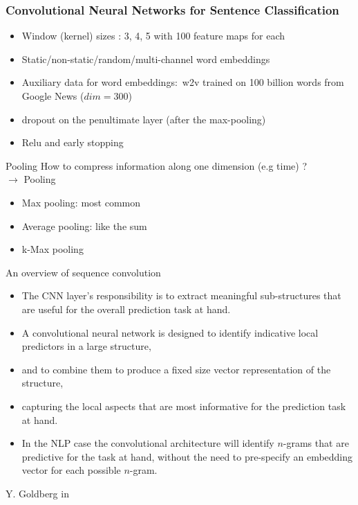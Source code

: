 \begin{frame}
  \frametitle{Convolutional Neural Networks for Sentence
    Classification}
  \begin{itemize}
  \item Window (kernel) sizes : 3, 4, 5 with 100 feature maps for each
  \item Static/non-static/random/multi-channel word embeddings
  \item Auxiliary data for word embeddings:~w2v trained on 100 billion words from
    Google News ($dim=300$) 
  \item dropout on the penultimate layer (after
    the max-pooling)
  \item Relu and early stopping
  \end{itemize}
\end{frame}


\begin{frame}{Pooling}
  How to compress information along one dimension (e.g time) ? \\
  $\rightarrow$ Pooling 
  
  \begin{itemize}
  \item Max pooling: most common
  \item Average  pooling: like the sum
  \item k-Max pooling
  \end{itemize}

\end{frame}


\begin{frame}{An overview of sequence convolution}
  \begin{itemize}
  \item The CNN layer's responsibility is to extract meaningful
    sub-structures that are useful for the overall prediction task at
    hand. 
  \item A convolutional neural network is designed to identify
    indicative local predictors in a large structure, 
  \item and to combine them to produce a fixed size vector representation of the
    structure, 
  \item capturing the local aspects that are most informative
    for the prediction task at hand. 
  \item In the NLP case the convolutional architecture will identify
    $n$-grams that are predictive for the task at hand, without the need
    to pre-specify an embedding vector for each possible $n$-gram.
  \end{itemize}
\begin{flushright}
  Y. Goldberg in \cite{Goldberg15Primer}
\end{flushright}
\end{frame}




